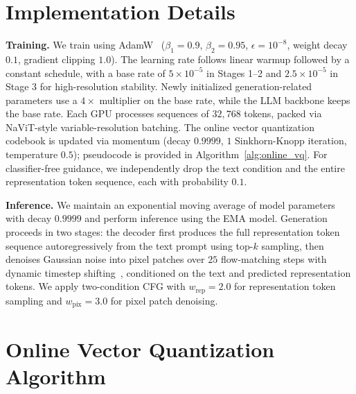 \section{Implementation Details}

\textbf{Training.} We train using AdamW~\cite{adamw} ($\beta_1{=}0.9$, $\beta_2{=}0.95$, $\epsilon{=}10^{-8}$, weight decay $0.1$, gradient clipping $1.0$). The learning rate follows linear warmup followed by a constant schedule, with a base rate of $5{\times}10^{-5}$ in Stages 1--2 and $2.5{\times}10^{-5}$ in Stage 3 for high-resolution stability. Newly initialized generation-related parameters use a $4{\times}$ multiplier on the base rate, while the LLM backbone keeps the base rate. Each GPU processes sequences of $32{,}768$ tokens, packed via NaViT-style variable-resolution batching. The online vector quantization codebook is updated via momentum (decay $0.9999$, $1$ Sinkhorn-Knopp iteration, temperature $0.5$); pseudocode is provided in Algorithm~\ref{alg:online_vq}. For classifier-free guidance, we independently drop the text condition and the entire representation token sequence, each with probability $0.1$.

\textbf{Inference.} We maintain an exponential moving average of model parameters with decay $0.9999$ and perform inference using the EMA model. Generation proceeds in two stages: the decoder first produces the full representation token sequence autoregressively from the text prompt using top-$k$ sampling, then denoises Gaussian noise into pixel patches over $25$ flow-matching steps with dynamic timestep shifting~\cite{sd3}, conditioned on the text and predicted representation tokens. We apply two-condition CFG with $w_{\text{rep}}{=}2.0$ for representation token sampling and $w_{\text{pix}}{=}3.0$ for pixel patch denoising.

\section{Online Vector Quantization Algorithm}
\label{sec:appendix-vq}

